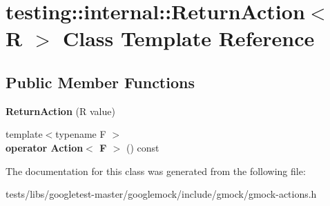\hypertarget{classtesting_1_1internal_1_1ReturnAction}{}\section{testing\+:\+:internal\+:\+:Return\+Action$<$ R $>$ Class Template Reference}
\label{classtesting_1_1internal_1_1ReturnAction}
\subsection*{Public Member Functions}
\begin{DoxyCompactItemize}
\item 
\mbox{\label{classtesting_1_1internal_1_1ReturnAction_af65344e503dae3ab36b4fd6d1ede6fb7}} 
{\bfseries Return\+Action} (R value)
\item 
\mbox{\label{classtesting_1_1internal_1_1ReturnAction_a1aab69c4ea104e76e70ba209763f61d5}} 
{\footnotesize template$<$typename F $>$ }\\{\bfseries operator Action$<$ F $>$} () const
\end{DoxyCompactItemize}


The documentation for this class was generated from the following file\+:\begin{DoxyCompactItemize}
\item 
tests/libs/googletest-\/master/googlemock/include/gmock/gmock-\/actions.\+h\end{DoxyCompactItemize}
